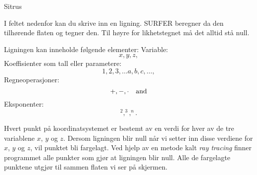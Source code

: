 \documentclass[no]{./../../common/SurferDesc}%
\begin{document}
\footnotesize
%
\begin{surferPage}
  \begin{surferTitle}Sitrus \end{surferTitle}   %
  
I feltet nedenfor kan du skrive inn en ligning. SURFER beregner da den tilhørende flaten og tegner den. 
Til høyre for likhetstegnet må det alltid stå null. 

Ligningen kan inneholde følgende elementer:
\newline
Variable:
\[x, y, z, \]
Koeffisienter som tall eller parametere:
\[1, 2, 3, \dots a, b, c, \dots, \]
Regneoperasjoner:
\[+,  - , \cdot \quad \textnormal{and} \]
Eksponenter:
\[ ^2, ^3, ^n .\]

Hvert punkt på koordinatsystemet er bestemt av en verdi for hver av de tre variablene $x$, $y$ og $z$. 
Dersom ligningen blir null når vi setter inn disse verdiene for $x$, $y$ og $z$, vil punktet bli fargelagt. 
Ved hjelp av en metode kalt \textit{ray tracing} finner programmet alle punkter som gjør at ligningen blir null. 
Alle de fargelagte punktene utgjør til sammen flaten vi ser på skjermen. 
  
  \begin{surferText}
     \end{surferText}
\end{surferPage}


\end{document}
